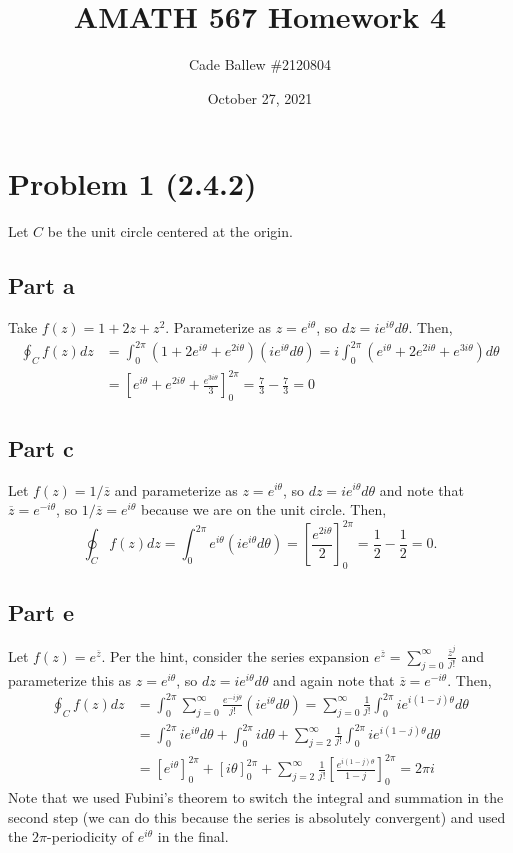 \documentclass{article}
\title{AMATH 567 Homework 4}
\author{Cade Ballew \#2120804}
\date{October 27, 2021}
\begin{document}
\maketitle

\section{Problem 1 (2.4.2)}
Let $C$ be the unit circle centered at the origin.
\subsection{Part a}
Take $f(z)=1+2z+z^2$. Parameterize as $z=e^{i\theta}$, so $dz=ie^{i\theta}d\theta$. Then,
\[
\begin{split}
\oint_Cf(z)dz&=\int_0^{2\pi}(1+2e^{i\theta}+e^{2i\theta})(ie^{i\theta}d\theta)=i\int_0^{2\pi}(e^{i\theta}+2e^{2i\theta}+e^{3i\theta})d\theta\\&=
\left[e^{i\theta}+e^{2i\theta}+\frac{e^{3i\theta}}{3}\right]_0^{2\pi}=\frac{7}{3}-\frac{7}{3}=0
\end{split}
\]
\subsection{Part c}
Let $f(z)=1/\overline{z}$ and parameterize as $z=e^{i\theta}$, so $dz=ie^{i\theta}d\theta$ and note that $\overline{z}=e^{-i\theta}$, so $1/\overline{z}=e^{i\theta}$ because we are on the unit circle. Then,
\[
\oint_Cf(z)dz=\int_0^{2\pi}e^{i\theta}(ie^{i\theta}d\theta)=\left[\frac{e^{2i\theta}}{2}\right]_0^{2\pi}=\frac{1}{2}-\frac{1}{2}=0.
\]
\subsection{Part e}
Let $f(z)=e^{\overline{z}}$. Per the hint, consider the series expansion $e^{\overline{z}}=\sum_{j=0}^\infty \frac{\overline{z}^j}{j!}$ and parameterize this as $z=e^{i\theta}$, so $dz=ie^{i\theta}d\theta$ and again note that $\overline{z}=e^{-i\theta}$. Then, 
\[
\begin{split}
\oint_Cf(z)dz&=\int_0^{2\pi}\sum_{j=0}^\infty \frac{e^{-ij\theta}}{j!}(ie^{i\theta}d\theta)=\sum_{j=0}^\infty\frac{1}{j!}\int_0^{2\pi}ie^{i(1-j)\theta}d\theta\\&=
\int_0^{2\pi}ie^{i\theta}d\theta+\int_0^{2\pi}id\theta+\sum_{j=2}^\infty\frac{1}{j!}\int_0^{2\pi}ie^{i(1-j)\theta}d\theta\\&=
\left[e^{i\theta}\right]_0^{2\pi}+\left[i\theta\right]_0^{2\pi}+\sum_{j=2}^\infty\frac{1}{j!}\left[\frac{e^{i(1-j)\theta}}{1-j}\right]_0^{2\pi}=2\pi i
\end{split}
\]
Note that we used Fubini's theorem to switch the integral and summation in the second step (we can do this because the series is absolutely convergent) and used the $2\pi$-periodicity of $e^{i\theta}$ in the final.
\end{document}

